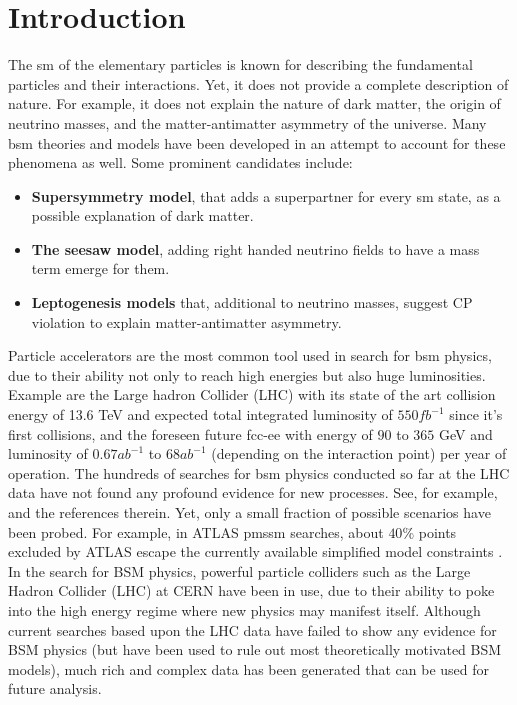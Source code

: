 \documentclass[paper/ddppaper2.tex]{subfiles}
\begin{document}
\section{Introduction}

The \gls{sm} of the elementary particles \cite{Grossman_StandardModel_2023} is known for describing the fundamental particles and their interactions. Yet, it does not provide a complete description of nature. For example, it does not explain the nature of dark matter, the origin of neutrino masses, and the matter-antimatter asymmetry of the universe. Many \gls{bsm} theories and models have been developed in an attempt to account for these phenomena as well. Some prominent candidates include:

\begin{itemize}
    \item \textbf{Supersymmetry model}, that adds a superpartner for every \gls{sm} state, as a possible explanation of dark matter.
    \item \textbf{The seesaw model}, adding right handed neutrino fields to have a mass term emerge for them.
    \item \textbf{Leptogenesis models} that, additional to neutrino masses, suggest CP violation to explain matter-antimatter asymmetry.
\end{itemize}

Particle accelerators are the most common tool used in search for \gls{bsm} physics, due to their ability not only to reach high energies but also huge luminosities. Example are the Large hadron Collider (LHC) \cite{CERN_Courier_LHC_Run3} with its state of the art collision energy of 13.6 TeV and expected total integrated luminosity of $550fb^{-1}$ since it's first collisions, and the foreseen future \gls{fcc-ee} \cite{Benedikt_2026_FCC} with energy of $90$ to $365$ GeV and luminosity of $0.67ab^{-1}$ to $68ab^{-1}$ (depending on the interaction point) per year of operation. The hundreds of searches for \gls{bsm} physics conducted so far at the LHC data have not found any profound evidence for new processes. See, for example, \cite{PDG_2024} and the references therein. Yet, only a small fraction of possible scenarios have been probed. For example, in ATLAS \gls{pmssm} searches, about $40\%$ points excluded by ATLAS escape the currently available simplified model constraints \cite{Ambrogi_2018_pMSSM_misses}. In the search for BSM physics, powerful particle colliders such as the Large Hadron Collider (LHC) at CERN have been in use, due to their ability to poke into the high energy regime where new physics may manifest itself. Although current searches based upon the LHC data have failed to show any evidence for BSM physics (but have been used to rule out most theoretically motivated BSM models), much rich and complex data has been generated that can be used for future analysis. \\
\end{document}
